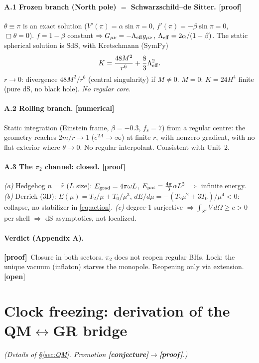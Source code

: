 \documentclass[11pt]{article}
\newcommand{\preuve}{{\small\textbf{[proof]}}}
\newcommand{\num}{{\small\textbf{[numerical]}}}
\newcommand{\conj}{{\small\textbf{[conjecture]}}}
\newcommand{\ouv}{{\small\textbf{[open]}}}
\theoremstyle{definition}
\begin{document}
\paragraph{A.1 Frozen branch (North pole) $=$ Schwarzschild--de Sitter. \preuve}
$\theta\equiv\pi$ is an exact solution ($V'(\pi)=\alpha\sin\pi=0$, $f'(\pi)=-\beta\sin\pi=0$,
$\Box\theta=0$). $f=1-\beta$ constant $\Rightarrow G_{\mu\nu}=-\Lambda_{\rm eff}g_{\mu\nu}$,
$\Lambda_{\rm eff}=2\alpha/(1-\beta)$. The static spherical solution is SdS, with Kretschmann (SymPy)
\[ K=\frac{48M^2}{r^6}+\frac{8}{3}\Lambda_{\rm eff}^2. \]
$r\to0$: divergence $48M^2/r^6$ (central singularity) if $M\ne0$. $M=0$: $K=24H^4$ finite (pure dS,
no black hole). \emph{No regular core.}

\paragraph{A.2 Rolling branch. \num}
Static integration (Einstein frame, $\beta=-0.3$, $f_s=7$) from a regular centre: the geometry reaches
$2m/r\to1$ ($e^{2\Lambda}\to\infty$) at finite $r$, with nonzero gradient, with no flat exterior where
$\theta\to0$. No regular interpolant. Consistent with Unit~2.

\paragraph{A.3 The $\pi_2$ channel: closed. \preuve}
\emph{(a)} Hedgehog $n=\hat r$ ($L$ size): $E_{\rm grad}=4\pi\omega L$, $E_{\rm pot}=\tfrac{4\pi}{3}\alpha L^3$
$\Rightarrow$ infinite energy. \emph{(b)} Derrick (3D): $E(\mu)=T_2/\mu+T_0/\mu^3$,
$dE/d\mu=-(T_2\mu^2+3T_0)/\mu^4<0$: collapse, no stabilizer in \eqref{eq:action}.
\emph{(c)} degree-1 surjective $\Rightarrow\int_{S^2}V\,d\Omega\ge c>0$ per shell $\Rightarrow$
dS asymptotics, not localized.

\paragraph{Verdict (Appendix A).} \preuve\ Closure in both sectors. $\pi_2$ does not reopen regular BHs.
Lock: the unique vacuum (inflaton) starves the monopole. Reopening only via extension. \ouv

\section{Clock freezing: derivation of the QM$\leftrightarrow$GR bridge}\label{ann:B}
\emph{(Details of \S\ref{sec:QM}. Promotion \conj$\to$\preuve.)}
\end{document}
